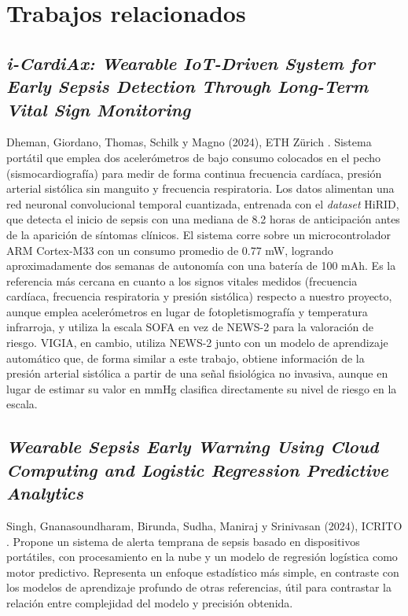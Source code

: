 \documentclass[11pt,a4paper]{article}
\begin{document}
\section{Trabajos relacionados}\label{sec:trabajos}

\subsection{\textit{i-CardiAx: Wearable IoT-Driven System for Early Sepsis Detection Through Long-Term Vital Sign Monitoring}}

Dheman, Giordano, Thomas, Schilk y Magno (2024), ETH Zürich \cite{ref17}. Sistema portátil que emplea dos acelerómetros de bajo consumo colocados en el pecho (sismocardiografía) para medir de forma continua frecuencia cardíaca, presión arterial sistólica sin manguito y frecuencia respiratoria. Los datos alimentan una red neuronal convolucional temporal cuantizada, entrenada con el \textit{dataset} HiRID, que detecta el inicio de sepsis con una mediana de 8.2 horas de anticipación antes de la aparición de síntomas clínicos. El sistema corre sobre un microcontrolador ARM Cortex-M33 con un consumo promedio de 0.77 mW, logrando aproximadamente dos semanas de autonomía con una batería de 100 mAh. Es la referencia más cercana en cuanto a los signos vitales medidos (frecuencia cardíaca, frecuencia respiratoria y presión sistólica) respecto a nuestro proyecto, aunque emplea acelerómetros en lugar de fotopletismografía y temperatura infrarroja, y utiliza la escala SOFA en vez de NEWS-2 para la valoración de riesgo. VIGIA, en cambio, utiliza NEWS-2 junto con un modelo de aprendizaje automático que, de forma similar a este trabajo, obtiene información de la presión arterial sistólica a partir de una señal fisiológica no invasiva, aunque en lugar de estimar su valor en mmHg clasifica directamente su nivel de riesgo en la escala.

\subsection{\textit{Wearable Sepsis Early Warning Using Cloud Computing and Logistic Regression Predictive Analytics}}

Singh, Gnanasoundharam, Birunda, Sudha, Maniraj y Srinivasan (2024), ICRITO \cite{ref18}. Propone un sistema de alerta temprana de sepsis basado en dispositivos portátiles, con procesamiento en la nube y un modelo de regresión logística como motor predictivo. Representa un enfoque estadístico más simple, en contraste con los modelos de aprendizaje profundo de otras referencias, útil para contrastar la relación entre complejidad del modelo y precisión obtenida.
\end{document}
